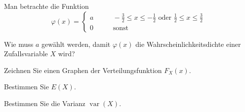 Man betrachte die Funktion
\[
\varphi(x)
=
\begin{cases}
a&\qquad -\frac32\le x\le -\frac12 \text{ oder } \frac12\le x\le \frac32
\\
0&\qquad\text{sonst}
\end{cases}
\]
\begin{teilaufgaben}
\item
Wie muss $a$ gewählt werden, damit $\varphi(x)$ die
Wahrscheinlichkeitsdichte einer Zufallsvariable $X$ wird?
\item
Zeichnen Sie einen Graphen der Verteilungsfunktion $F_X(x)$.
\item
Bestimmen Sie $E(X)$.
\item
Bestimmen Sie die Varianz $\operatorname{var}(X)$.
\end{teilaufgaben}


